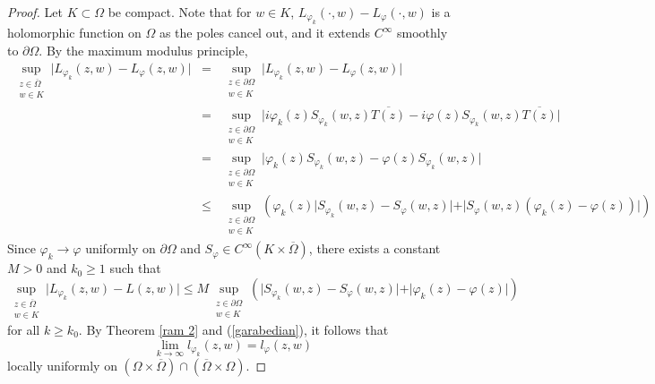 \documentclass[11pt, reqno]{amsart}
\numberwithin{equation}{section}
\begin{document}
\begin{proof}
Let $K\subset\Omega$ be compact. Note that for $w\in K$, $L_{\varphi_k}(\cdot,w)-L_{\varphi}(\cdot,w)$ is a holomorphic function on $\Omega$ as the poles cancel out, and it extends $C^{\infty}$ smoothly to $\partial\Omega$. By the maximum modulus principle,
\begin{eqnarray*}
\sup\limits_{\substack{z\in\overline{\Omega}\\ w\in K}}\vert L_{\varphi_k}(z,w)-L_{\varphi}(z,w)\vert
&=&    
\sup\limits_{\substack{z\in\partial\Omega\\ w\in K}}\vert L_{\varphi_k}(z,w)-L_{\varphi}(z,w)\vert\\
&=&
\sup\limits_{\substack{z\in\partial\Omega\\ w\in K}}\vert i\varphi_k(z)S_{\varphi_k}(w,z)\overline{T(z)}-i\varphi(z)S_{\varphi_k}(w,z)\overline{T(z)}\vert\\
&=&
\sup\limits_{\substack{z\in\partial\Omega\\ w\in K}}\vert \varphi_k(z)S_{\varphi_k}(w,z)-\varphi(z)S_{\varphi_k}(w,z)\vert\\
& \leq &
\sup_{\substack{z\in \partial\Omega\\ w\in K}}\left(\varphi_k(z)\vert S_{\varphi_k}(w,z) - S_{\varphi}(w,z) \vert + \vert S_{\varphi}(w,z) (\varphi_k(z) - \varphi(z)) \vert\right)
\end{eqnarray*}
Since $\varphi_k\rightarrow \varphi$ uniformly on $\partial\Omega$ and $S_{\varphi}\in C^{\infty}(K\times \overline{\Omega})$, there exists a constant $M>0$ and $k_0 \ge 1$ such that
\[
\sup_{\substack{z\in \overline{\Omega}\\ w\in K}}\vert L_{\varphi_k}(z,w) - L(z,w)\vert 
\leq 
M \sup_{\substack{z\in \partial\Omega\\ w\in K}}\left(\vert S_{\varphi_k}(w,z) - S_{\varphi}(w,z) \vert + \vert \varphi_k(z) - \varphi(z) \vert\right)
\]
for all $k\geq k_0$. By Theorem \ref{ram 2} and (\ref{garabedian}), it follows that
\begin{equation}\label{gar}
\lim_{k\rightarrow\infty} l_{\varphi_k}(z,w) = l_{\varphi}(z,w)
\end{equation}
locally uniformly on $(\Omega\times\overline{\Omega}) \cap (\overline{\Omega}\times \Omega)$.

\medskip


\end{proof}
\end{document}
